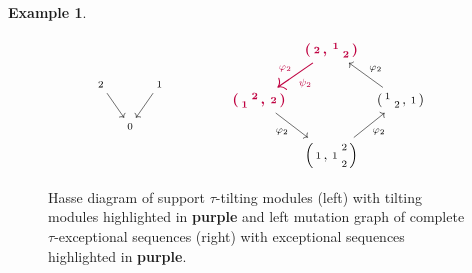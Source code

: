\documentclass[10pt,twoside, a4paper,reqno]{amsart}
\theoremstyle{definition}
\newtheorem{example}[theorem]{Example}
\begin{document}
\begin{example}
\begin{figure}[ht!]
\[\begin{tikzcd}[ampersand replacement=\&, column sep=5]
        \begin{smallmatrix}2\end{smallmatrix} \arrow[rd] \& \& \begin{smallmatrix}1\end{smallmatrix} \arrow[ld] \\
        \& \begin{smallmatrix}0 \end{smallmatrix} 
    \end{tikzcd}
    \qquad  \qquad
    \begin{tikzcd}[ampersand replacement=\&, column sep=5]
        \& {\color{purple}\boldsymbol{\left(\begin{smallmatrix}2\end{smallmatrix}, \begin{smallmatrix}1&\\&2\end{smallmatrix} \right)}} \arrow[ld, "\varphi_2"', "\psi_2", thick, purple] \\
        {\color{purple}\boldsymbol{\left(\begin{smallmatrix}&2\\1&\end{smallmatrix}, \begin{smallmatrix}2\end{smallmatrix} \right)}} \arrow[rd, "\varphi_2",swap] \& \& \left(\begin{smallmatrix}1&\\&2\end{smallmatrix}, \begin{smallmatrix}1\end{smallmatrix} \right) \arrow[lu, "\varphi_2",swap]\\
        \& \left(\begin{smallmatrix}1\end{smallmatrix}, \begin{smallmatrix}&2\\1&\\&2\end{smallmatrix} \right) \arrow[ru, "\varphi_2",swap]
    \end{tikzcd}
    \]
    \caption{Hasse diagram of support $\tau$-tilting modules (left) with tilting modules highlighted in {\color{purple}\textbf{purple}} and left mutation graph of complete $\tau$-exceptional sequences (right) with exceptional sequences highlighted in {\color{purple}\textbf{purple}}.}
    \label{fig:introfigex}
    \end{figure}
\end{example}
\end{document}
